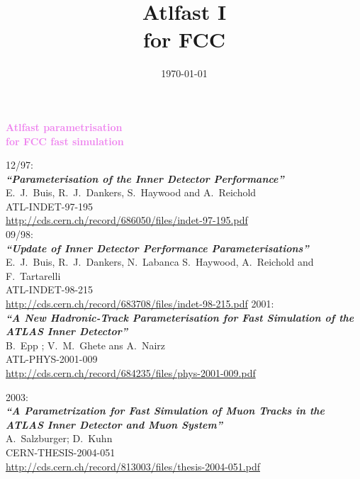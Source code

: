 \documentclass[8pt]{beamer}
\title{\bf Atlfast I\\ for FCC}
\date{\today}
\begin{document}

\begin{frame}
  \begin{center}
    {\textcolor{violet}{\LARGE{\bf Atlfast parametrisation\\for FCC fast simulation}}}
  \end{center}
\end{frame}

\begin{frame}

\color{violet}{\Large \bf  Bibliography:}
\small
\vfill
{\large 12/97: } \\
{\bf\it``Parameterisation of the Inner Detector Performance''}\\
  E.~J.~Buis, R.~J.~Dankers, S.~Haywood and A.~Reichold\\
ATL-INDET-97-195\\
\url{http://cds.cern.ch/record/686050/files/indet-97-195.pdf}\\
\vfill
{\large 09/98: } \\
{\bf\it``Update of Inner Detector Performance Parameterisations''}\\
  E.~J.~Buis, R.~J.~Dankers, N.~Labanca S.~Haywood, A.~Reichold and F.~Tartarelli\\
ATL-INDET-98-215\\
\url{http://cds.cern.ch/record/683708/files/indet-98-215.pdf}
\vfill
{\large 2001: } \\
{\bf\it``A New Hadronic-Track Parameterisation for Fast Simulation of the ATLAS Inner Detector''}\\
  B.~Epp ; V.~M.~Ghete ans A.~Nairz\\
ATL-PHYS-2001-009\\
\url{http://cds.cern.ch/record/684235/files/phys-2001-009.pdf}

\vfill
{\large 2003: } \\
{\bf\it``A Parametrization for Fast Simulation of Muon Tracks in the ATLAS Inner Detector and Muon System''}\\
  A.~Salzburger; D.~Kuhn\\
CERN-THESIS-2004-051\\
\url{http://cds.cern.ch/record/813003/files/thesis-2004-051.pdf}


\end{frame}
\restoregeometry
\end{document}

